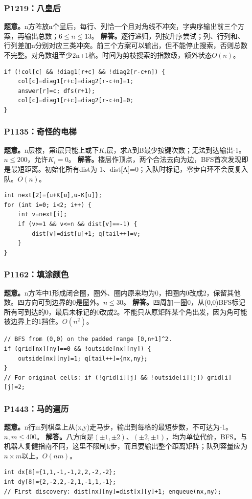 \subsubsection{P1219：八皇后}
\textbf{题意。}n方阵放n个皇后，每行、列恰一个且对角线不冲突，字典序输出前三个方案，再输出总数；$6\le n\le13$。
\textbf{解答。}逐行递归，列按升序尝试；列、行列和、行列差加n分别对应三类冲突。前三个方案可以输出，但不能停止搜索，否则总数不完整。对角数组至少2n+1格。时间为剪枝搜索的指数级，额外状态$O(n)$。
\begin{lstlisting}
if (!col[c] && !diag1[r+c] && !diag2[r-c+n]) {
    col[c]=diag1[r+c]=diag2[r-c+n]=1;
    answer[r]=c; dfs(r+1);
    col[c]=diag1[r+c]=diag2[r-c+n]=0;
}
\end{lstlisting}

\subsubsection{P1135：奇怪的电梯}
\textbf{题意。}n层楼，第i层只能上或下$K_i$层，求A到B最少按键次数；无法到达输出-1。$n\le200$，允许$K_i=0$。
\textbf{解答。}楼层作顶点，两个合法去向为边，BFS首次发现即是最短距离。初始化所有dist为-1、dist[A]=0；入队时标记，零步自环不会反复入队。$O(n)$。
\begin{lstlisting}
int next[2]={u+K[u],u-K[u]};
for (int i=0; i<2; i++) {
    int v=next[i];
    if (v>=1 && v<=n && dist[v]==-1) {
        dist[v]=dist[u]+1; q[tail++]=v;
    }
}
\end{lstlisting}

\subsubsection{P1162：填涂颜色}
\textbf{题意。}n方阵中1形成闭合圈，圈外、圈内原来均为0，把圈内0改成2，保留其他数。四方向可到边界的0是圈外。$n\le30$。
\textbf{解答。}四周加一圈0，从(0,0)BFS标记所有可到达的0，最后未标记的0改成2。不能只从原矩阵某个角出发，因为角可能被边界上的1挡住。$O(n^2)$。
\begin{lstlisting}
// BFS from (0,0) on the padded range [0,n+1]^2.
if (grid[nx][ny]==0 && !outside[nx][ny]) {
    outside[nx][ny]=1; q[tail++]={nx,ny};
}
// For original cells: if (!grid[i][j] && !outside[i][j]) grid[i][j]=2;
\end{lstlisting}

\subsubsection{P1443：马的遍历}
\textbf{题意。}n行m列棋盘上从(x,y)走马步，输出到每格的最短步数，不可达为-1。$n,m\le400$。
\textbf{解答。}八方向是$(\pm1,\pm2)$、$(\pm2,\pm1)$，均为单位代价，BFS。与机器人复健指南不同，这里不限制k步，而且要输出整个距离矩阵；队列容量应为$n\times m$以上。$O(nm)$。
\begin{lstlisting}
int dx[8]={1,1,-1,-1,2,2,-2,-2};
int dy[8]={2,-2,2,-2,1,-1,1,-1};
// First discovery: dist[nx][ny]=dist[x][y]+1; enqueue(nx,ny);
\end{lstlisting}


